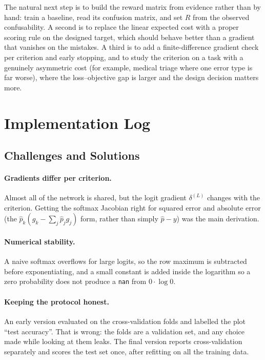 \documentclass[11pt]{article}
\begin{document}
The natural next step is to build the reward matrix from evidence rather than by hand: train a
baseline, read its confusion matrix, and set $R$ from the observed confusability. A second is to
replace the linear expected cost with a proper scoring rule on the designed target, which should
behave better than a gradient that vanishes on the mistakes. A third is to add a finite-difference
gradient check per criterion and early stopping, and to study the criterion on a task with a
genuinely asymmetric cost (for example, medical triage where one error type is far worse), where
the loss--objective gap is larger and the design decision matters more.

\section{Implementation Log}
\label{sec:log}

\subsection{Challenges and Solutions}

\paragraph{Gradients differ per criterion.} Almost all of the network is shared, but the logit
gradient $\delta^{(L)}$ changes with the criterion. Getting the softmax Jacobian right for
squared error and absolute error (the $\hat p_k(g_k-\sum_j\hat p_j g_j)$ form, rather than
simply $\hat p-y$) was the main derivation.

\paragraph{Numerical stability.} A naive softmax overflows for large logits, so the row maximum
is subtracted before exponentiating, and a small constant is added inside the logarithm so a
zero probability does not produce a \texttt{nan} from $0\cdot\log 0$.

\paragraph{Keeping the protocol honest.} An early version evaluated on the cross-validation
folds and labelled the plot ``test accuracy''. That is wrong: the folds are a validation set,
and any choice made while looking at them leaks. The final version reports cross-validation
separately and scores the test set once, after refitting on all the training data.
\end{document}

